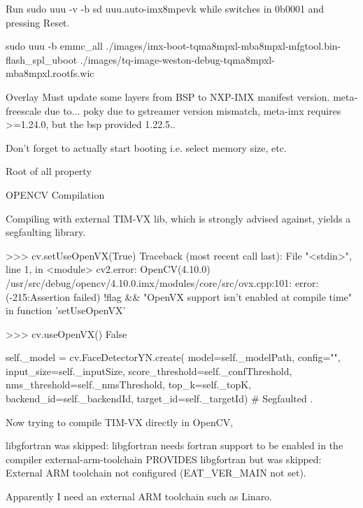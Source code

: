 Run sudo uuu -v -b sd uuu.auto-imx8mpevk
while switches in 0b0001 and pressing Reset.

sudo uuu -b emmc_all ./images/imx-boot-tqma8mpxl-mba8mpxl-mfgtool.bin-flash_spl_uboot ./images/tq-image-weston-debug-tqma8mpxl-mba8mpxl.rootfs.wic

Overlay
Must update some layers from BSP to NXP-IMX manifest version.
meta-freescale due to...
poky due to gstreamer version mismatch, meta-imx requires >=1.24.0,
but the bsp provided 1.22.5..

Don't forget to actually start booting i.e. select memory size, etc.


Root of all property 

\sec OPENCV Compilation

Compiling with external TIM-VX lib,
which is strongly advised against,
yields a segfaulting library.

\begtt{}
>>> cv.setUseOpenVX(True)
Traceback (most recent call last):
  File "<stdin>", line 1, in <module>
cv2.error: OpenCV(4.10.0) /usr/src/debug/opencv/4.10.0.imx/modules/core/src/ovx.cpp:101: error: (-215:Assertion failed) !flag && "OpenVX support isn't enabled at compile time" in function 'setUseOpenVX'

>>> cv.useOpenVX()
False

self._model = cv.FaceDetectorYN.create(
            model=self._modelPath,
            config="",
            input_size=self._inputSize,
            score_threshold=self._confThreshold,
            nms_threshold=self._nmsThreshold,
            top_k=self._topK,
            backend_id=self._backendId,
            target_id=self._targetId)
	    # Segfaulted
\endtt
.

Now trying to compile TIM-VX directly in OpenCV,

\begtt
libgfortran was skipped: libgfortran needs fortran support to be enabled in the compiler
external-arm-toolchain PROVIDES libgfortran but was skipped: External ARM toolchain not configured (EAT_VER_MAIN not set).
\endtt

Apparently I need an external ARM toolchain such as Linaro.

